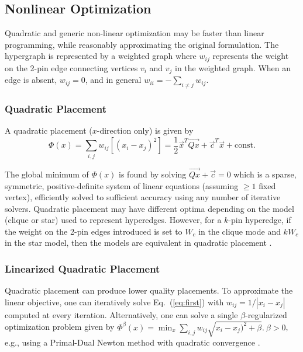 \documentclass[natbib]{svcyclop}
\begin{document}
\subsection{Nonlinear Optimization}
Quadratic and generic non-linear optimization may be
faster than linear programming, while reasonably approximating
the original formulation. The hypergraph is represented
by a weighted graph where $w_{ij}$ represents the
weight on the 2-pin edge connecting vertices $v_i$ and $v_j$ in
the weighted graph. When an edge is absent, $w_{i j} = 0$, and
in general $w_{ii} = -\sum_{i\neq j}w_{i j}$.

\subsubsection{Quadratic Placement} A quadratic placement ($x$-direction
only) is given by
\begin{equation}\label{eq:first}
\Phi(x) = \sum_{i,j}w_{ij}\left[(x_i-x_j)^2\right]=
\frac12\vec{x}^T\vec{Qx}+\vec{c}^T\vec{x}+\text{const.}
\end{equation}

The global minimum of $\Phi(x)$ is found by solving $\vec{Qx}+\vec{c} = 0$
which is a sparse, symmetric, positive-definite system of
linear equations (assuming $\ge 1$ fixed vertex), efficiently
solved to sufficient accuracy using any number of iterative
solvers. Quadratic placement may have different optima
depending on the model (clique or star) used to represent
hyperedges. However, for a $k$-pin hyperedge, if the
weight on the 2-pin edges introduced is set to $W_c$ in the
clique mode and $kW_c$ in the star model, then the models
are equivalent in quadratic placement \cite{RedCho06}.

\subsubsection{Linearized Quadratic Placement} Quadratic placement
can produce lower quality placements. To approximate the
linear objective, one can iteratively solve Eq.~(\ref{eq:first}) with $w_{i j} =
1/|x_i-x_j|$ computed at every iteration. Alternatively, one
can solve a single $\beta$-regularized optimization problem
given by $\Phi^\beta(x) = \min_x\sum_{i,j}w_{ij}\sqrt{x_i-x_j)^2+\beta}.\ \beta > 0$,
e.g., using a Primal-Dual Newton method with quadratic
convergence \cite{AlpChKaMaMu98}.
\end{document}
